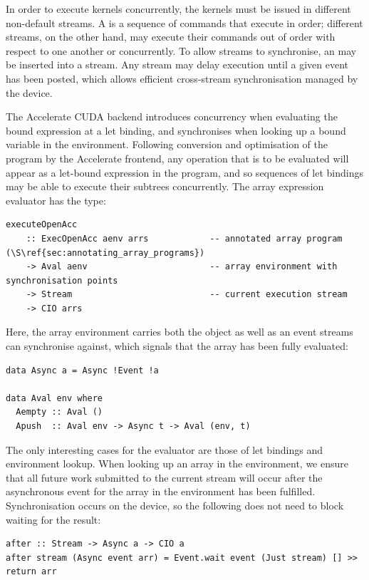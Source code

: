 In order to execute kernels concurrently, the kernels must be issued in
different non-default streams. A  is a sequence of commands that
execute in order; different streams, on the other hand, may execute their
commands out of order with respect to one another or concurrently. To allow
streams to synchronise, an  may be inserted into a stream. Any
stream may delay execution until a given event has been posted, which allows
efficient cross-stream synchronisation managed by the device.

The Accelerate CUDA backend introduces concurrency when evaluating the bound
expression at a let binding, and synchronises when looking up a bound variable
in the environment. Following conversion and optimisation of the program by the
Accelerate frontend, any operation that is to be evaluated will appear as a
let-bound expression in the program, and so sequences of let bindings may be
able to execute their subtrees concurrently. The array expression evaluator has
the type:
%
\begin{lstlisting}[style=haskell]
executeOpenAcc
    :: ExecOpenAcc aenv arrs            -- annotated array program (\S\ref{sec:annotating_array_programs})
    -> Aval aenv                        -- array environment with synchronisation points
    -> Stream                           -- current execution stream
    -> CIO arrs
\end{lstlisting}
%
Here, the array environment carries both the object as well as an event streams
can synchronise against, which signals that the array has been fully evaluated:
%
\begin{lstlisting}[style=haskell]
data Async a = Async !Event !a

data Aval env where
  Aempty :: Aval ()
  Apush  :: Aval env -> Async t -> Aval (env, t)
\end{lstlisting}

The only interesting cases for the evaluator are those of let bindings and
environment lookup. When looking up an array in the environment, we ensure that
all future work submitted to the current stream will occur after the
asynchronous event for the array in the environment has been fulfilled.
Synchronisation occurs on the device, so the following does not need to block
waiting for the result:
%
\begin{lstlisting}[style=haskell]
after :: Stream -> Async a -> CIO a
after stream (Async event arr) = Event.wait event (Just stream) [] >> return arr
\end{lstlisting}

